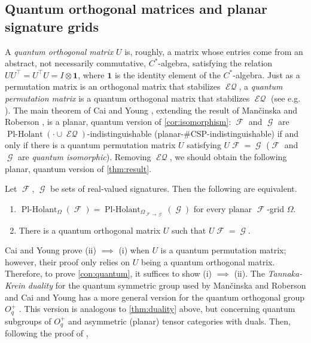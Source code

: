 \documentclass{theoretics}
\DeclareMathOperator{\fc}{\mathcal{F}}
\DeclareMathOperator{\gc}{\mathcal{G}}
\DeclareMathOperator{\plholant}{Pl-Holant}
\DeclareMathOperator{\eq}{\mathcal{EQ}}
\begin{document}
\subsection{Quantum orthogonal matrices and planar signature grids}
A \emph{quantum orthogonal matrix} $U$ is, roughly, a matrix whose entries come from an abstract,
not necessarily commutative,
$C^*$-algebra, satisfying the relation $UU^\top = U^\top U = I \otimes \mathbf{1}$, where $\mathbf{1}$
is the identity element of the $C^*$-algebra.
Just as a permutation matrix is an orthogonal matrix that stabilizes $\eq$, 
a \emph{quantum permutation matrix} is a quantum orthogonal matrix that
stabilizes $\eq$ (see e.g. \cite[Equation 27]{cai_planar_2023}). The main theorem of Cai and Young
\cite{cai_planar_2023}, extending the result of Man\v{c}inska and Roberson \cite{planar}, is a planar,
quantum version of \autoref{cor:isomorphism}:
$\fc$ and $\gc$ are $\plholant(\cdot \cup \eq)$-indistinguishable 
(planar-\#CSP-indistinguishable) if and only if there is a quantum permutation matrix $U$ satisfying
$U \fc = \gc$ ($\fc$ and $\gc$ are \emph{quantum isomorphic}). 
Removing $\eq$, we should obtain the following planar, quantum version of \autoref{thm:result}.
\begin{conjecture}
    \label{con:quantum}
    Let $\fc$, $\gc$ be sets of real-valued signatures. Then the following are equivalent.
    \begin{enumerate}[label=(\roman*)]
        \item $\plholant_{\Omega}(\fc) = \plholant_{\Omega_{\fc\to\gc}}(\gc)$
        for every planar $\fc$-grid $\Omega$.
        \item There is a quantum orthogonal matrix $U$ such that $U\fc = \gc$.
    \end{enumerate}
\end{conjecture}
Cai and Young \cite[Theorem 5]{cai_planar_2023} prove (ii) $\implies$ (i) when $U$ is a quantum permutation matrix;
however, their proof only relies on $U$ being a quantum orthogonal matrix. Therefore,
to prove \autoref{con:quantum}, it suffices to show (i) $\implies$ (ii). The \emph{Tannaka-Krein duality}
for the quantum symmetric group used by Man\v{c}inska and Roberson and Cai and Young 
\cite[Theorem 3]{cai_planar_2023} has a more general version
for the quantum orthogonal group $O_q^+$ \cite[Theorem 2.13]{planar}. This version is
analogous to \autoref{thm:duality} above, but concerning quantum subgroups of $O_q^+$ and asymmetric
(planar) tensor categories with duals. Then, following the proof of \cite[Theorem 4]{cai_planar_2023},
\end{document}
